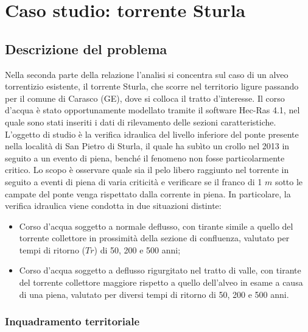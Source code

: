\documentclass[12pt]{article} %
\begin{document}
\newpage

\section{Caso studio: torrente Sturla}
\subsection{Descrizione del problema}
\noindent Nella seconda parte della relazione l’analisi si concentra sul caso di un alveo torrentizio esistente, il torrente Sturla, che scorre nel territorio ligure passando per il comune di Carasco (GE), dove si colloca il tratto d’interesse. Il corso d’acqua è stato opportunamente modellato tramite il software Hec-Ras 4.1, nel quale sono stati inseriti i dati di rilevamento delle sezioni caratteristiche.
L’oggetto di studio è la verifica idraulica del livello inferiore del ponte presente nella località di San Pietro di Sturla, il quale ha subìto un crollo nel 2013 in seguito a un evento di piena, benché il fenomeno non fosse particolarmente critico. Lo scopo è osservare quale sia il pelo libero raggiunto nel torrente in seguito a eventi di piena di varia criticità e verificare se il franco di 1 $m$ sotto le campate del ponte venga rispettato dalla corrente in piena.
In particolare, la verifica idraulica viene condotta in due situazioni distinte:

\begin{itemize}
    \item Corso d'acqua soggetto a normale deflusso, con tirante simile a quello del torrente collettore in prossimità della sezione di confluenza, valutato per tempi di ritorno ($Tr$) di 50, 200 e 500 anni;
    \item Corso d'acqua soggetto a deflusso rigurgitato nel tratto di valle, con tirante del torrente collettore maggiore rispetto a quello dell'alveo in esame a causa di una piena, valutato per diversi tempi di ritorno di 50, 200 e 500 anni.
\end{itemize}

\subsubsection{Inquadramento territoriale}
\end{document}
